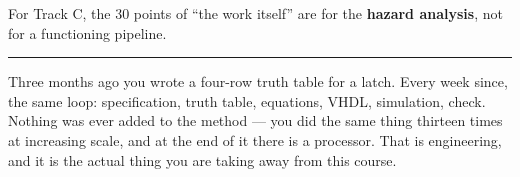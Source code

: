 \documentclass[11pt]{article}
\newcommand{\hr}{\vspace{2pt}\hrule\vspace{6pt}}
\begin{document}
For Track C, the 30 points of ``the work itself'' are for the \textbf{hazard
analysis}, not for a functioning pipeline.

\vspace{10pt}
\hr
{\small Three months ago you wrote a four-row truth table for a latch. Every week
since, the same loop: specification, truth table, equations, VHDL, simulation,
check. Nothing was ever added to the method --- you did the same thing thirteen
times at increasing scale, and at the end of it there is a processor. That is
engineering, and it is the actual thing you are taking away from this course.}
\end{document}

